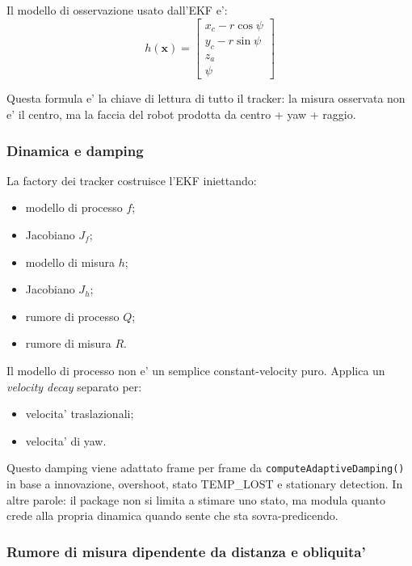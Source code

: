 \documentclass[11pt,a4paper]{article}
\newcommand{\code}[1]{\texttt{#1}}
\begin{document}
Il modello di osservazione usato dall'EKF e':
\begin{equation}
  h(\mathbf{x}) =
  \begin{bmatrix}
    x_c - r \cos \psi \\
    y_c - r \sin \psi \\
    z_a \\
    \psi
  \end{bmatrix}
\end{equation}

Questa formula e' la chiave di lettura di tutto il tracker: la misura osservata non e' il centro, ma la faccia del robot prodotta da centro + yaw + raggio.

\subsubsection{Dinamica e damping}

La factory dei tracker costruisce l'EKF iniettando:
\begin{itemize}[leftmargin=1.4em]
  \item modello di processo \(f\);
  \item Jacobiano \(J_f\);
  \item modello di misura \(h\);
  \item Jacobiano \(J_h\);
  \item rumore di processo \(Q\);
  \item rumore di misura \(R\).
\end{itemize}

Il modello di processo non e' un semplice constant-velocity puro. Applica un \emph{velocity decay} separato per:
\begin{itemize}[leftmargin=1.4em]
  \item velocita' traslazionali;
  \item velocita' di yaw.
\end{itemize}

Questo damping viene adattato frame per frame da \code{computeAdaptiveDamping()} in base a innovazione, overshoot, stato TEMP\_LOST e stationary detection. In altre parole: il package non si limita a stimare uno stato, ma modula quanto crede alla propria dinamica quando sente che sta sovra-predicendo.

\subsubsection{Rumore di misura dipendente da distanza e obliquita'}
\end{document}
